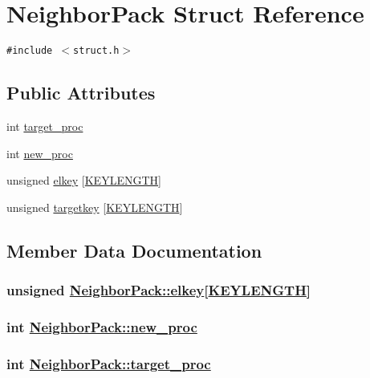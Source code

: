 \hypertarget{structNeighborPack}{
\section{Neighbor\-Pack Struct Reference}
\label{structNeighborPack}
}
{\tt \#include $<$struct.h$>$}

\subsection*{Public Attributes}
\begin{CompactItemize}
\item 
int \hyperlink{structNeighborPack_o0}{target\_\-proc}
\item 
int \hyperlink{structNeighborPack_o1}{new\_\-proc}
\item 
unsigned \hyperlink{structNeighborPack_o2}{elkey} \mbox{[}\hyperlink{constant_8h_a10}{KEYLENGTH}\mbox{]}
\item 
unsigned \hyperlink{structNeighborPack_o3}{targetkey} \mbox{[}\hyperlink{constant_8h_a10}{KEYLENGTH}\mbox{]}
\end{CompactItemize}


\subsection{Member Data Documentation}
\hypertarget{structNeighborPack_o2}{
\subsubsection[elkey]{\setlength{\rightskip}{0pt plus 5cm}unsigned \hyperlink{structNeighborPack_o2}{Neighbor\-Pack::elkey}\mbox{[}\hyperlink{constant_8h_a10}{KEYLENGTH}\mbox{]}}}
\label{structNeighborPack_o2}


\hypertarget{structNeighborPack_o1}{
\subsubsection[new\_\-proc]{\setlength{\rightskip}{0pt plus 5cm}int \hyperlink{structNeighborPack_o1}{Neighbor\-Pack::new\_\-proc}}}
\label{structNeighborPack_o1}


\hypertarget{structNeighborPack_o0}{
\subsubsection[target\_\-proc]{\setlength{\rightskip}{0pt plus 5cm}int \hyperlink{structNeighborPack_o0}{Neighbor\-Pack::target\_\-proc}}}
\label{structNeighborPack_o0}


